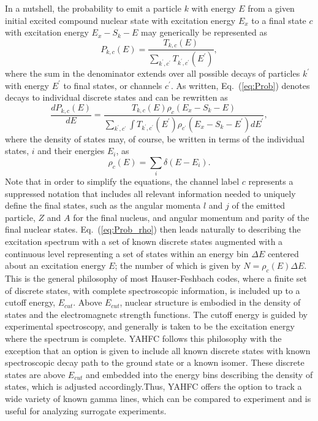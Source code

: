 \documentclass[
10pt,
showpacs,preprintnumbers,footinbib,
amsfonts,amsmath,amssymb,
aps,
prc,twocolumn,groupedaddress,superscriptaddress,
showkeys,
nofootinbib
]{revtex4-1}
\begin{document}
In a nutshell, the probability to emit a particle $k$ with energy $E$ from a given initial excited compound nuclear state with excitation energy $E_x$ to a final state $c$ with excitation energy $E_x - S_k - E$ may generically be represented as
\begin{equation}
P_{k,c}(E) = \frac{T_{k,c}(E)}{\sum_{k^\prime,c^\prime}T_{k^\prime,c^\prime}(E^\prime)},
\label{eq:Prob}
\end{equation} 
where the sum in the denominator extends over all possible decays of particles $k^\prime$ with energy $E^\prime$ to final states, or channels $c^\prime$. As written, Eq.~(\ref{eq:Prob}) denotes decays to individual discrete states and can be rewritten as
\begin{equation}
\frac{dP_{k,c}(E)}{dE} = \frac{T_{k,c}(E)\rho_c(E_x-S_k - E)}{\sum_{k^\prime,c^\prime}\int T_{k^\prime,c^\prime}(E^\prime)\rho_{c^\prime}(E_x-S_k - E^\prime)dE^\prime},
\label{eq:Prob_rho}
\end{equation}
where the density of states may, of course, be written in terms of the individual states, $i$ and their energies $E_i$, as
\begin{equation}
\rho_c(E) = \sum_i \delta (E - E_i).
\end{equation}
Note that in order to simplify the equations, the channel label $c$ represents a suppressed notation that includes all relevant information needed to uniquely define the final states, such as the angular momenta $l$ and $j$ of the emitted particle, $Z$ and $A$ for the final nucleus, and angular momentum and parity of the final nuclear states. Eq.~(\ref{eq:Prob_rho}) then leads naturally to describing the excitation spectrum with a set of known discrete states augmented with a continuous level representing a set of states within an energy bin $\Delta E$ centered about an excitation energy $E$; the number of which is given by $N=\rho_c(E)\Delta E$. This is the general philosophy of most Hauser-Feshbach codes, where a finite set of discrete states, with complete spectroscopic information, is included up to a cutoff energy, $E_{cut}$. Above $E_{cut}$, nuclear structure is embodied in the density of states and the electromagnetc strength functions. The cutoff energy is guided by experimental spectroscopy, and generally is taken to be the excitation energy where the spectrum is complete. YAHFC follows this philosophy with the exception that an option is given to include all known discrete states with known spectroscopic decay path to the ground state or a known isomer. These discrete states are above $E_{cut}$ and embedded into the energy bins describing the density of states, which is adjusted accordingly.Thus, YAHFC offers the option to track a wide variety of known gamma lines, which can be compared to experiment and is useful for analyzing surrogate experiments. 
\end{document}
